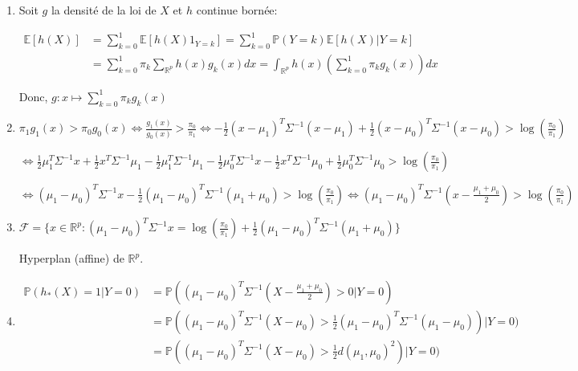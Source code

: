 \documentclass[10pt,a4paper,oneside]{article}
\begin{document}
\begin{enumerate}
\item
Soit $g$ la densité de la loi de $X$ et $h$ continue bornée:

\begin{align*}
\mathbb{E}[h(X)] &= \sum_{k = 0}^1 \mathbb{E}[h(X) 1_{Y = k}] = \sum_{k = 0}^1 \mathbb{P}(Y = k) \mathbb{E} [h(X) | Y = k] \\
&= \sum_{k = 0}^1 \pi_k \sum_{\mathbb{R}^p} h(x) g_k(x) dx = \int_{\mathbb{R}^p} h(x) \left( \sum_{k = 0}^1 \pi_k g_k(x) \right) dx
\end{align*}

Donc, $g : x \mapsto \sum_{k = 0}^1 \pi_k g_k(x)$

\item
$\pi_1 g_1(x) > \pi_0 g_0(x) \Leftrightarrow \frac{g_1(x)}{g_0(x)} > \frac{\pi_0}{\pi_1} \Leftrightarrow -\frac{1}{2} (x - \mu_1)^T \Sigma^{-1} (x - \mu_1) + \frac{1}{2} (x - \mu_0)^T \Sigma^{-1} (x - \mu_0) > \log(\frac{\pi_0}{\pi_1})$

$\Leftrightarrow \frac{1}{2} \mu_1^T \Sigma^{-1} x + \frac{1}{2} x^T \Sigma^{-1} \mu_1 - \frac{1}{2} \mu_1^T \Sigma^{-1} \mu_1 - \frac{1}{2} \mu_0^T \Sigma^{-1} x - \frac{1}{2} x^T \Sigma^{-1} \mu_0 + \frac{1}{2} \mu_0^T \Sigma^{-1} \mu_0 > \log(\frac{\pi_0}{\pi_1})$

$\Leftrightarrow (\mu_1 - \mu_0)^T \Sigma^{-1} x - \frac{1}{2} (\mu_1 - \mu_0)^T \Sigma^{-1} (\mu_1 + \mu_0) > \log(\frac{\pi_0}{\pi_1}) \Leftrightarrow (\mu_1 - \mu_0)^T \Sigma^{-1} ( x - \frac{\mu_1 + \mu_0}{2} ) > \log(\frac{\pi_0}{\pi_1})$

\item
$\mathcal{F} = \{ x \in \mathbb{R}^p : (\mu_1 - \mu_0)^T \Sigma^{-1} x = \log(\frac{\pi_0}{\pi_1}) + \frac{1}{2} (\mu_1 - \mu_0)^T \Sigma^{-1} (\mu_1 + \mu_0) \}$

Hyperplan (affine) de $\mathbb{R}^p$.

\item
\begin{align*}
\mathbb{P}(h_*(X) = 1 | Y = 0) &= \mathbb{P}((\mu_1 - \mu_0)^T \Sigma^{-1} (X - \frac{\mu_1 + \mu_0}{2} ) > 0 | Y = 0) \\
&= \mathbb{P}((\mu_1 - \mu_0)^T \Sigma^{-1} (X - \mu_0) > \frac{1}{2}(\mu_1 - \mu_0)^T \Sigma^{-1} (\mu_1 - \mu_0) ) | Y = 0) \\
&= \mathbb{P}((\mu_1 - \mu_0)^T \Sigma^{-1} (X - \mu_0) > \frac{1}{2}d(\mu_1,\mu_0)^2 ) | Y = 0)
\end{align*}


\end{enumerate}
\end{document}

